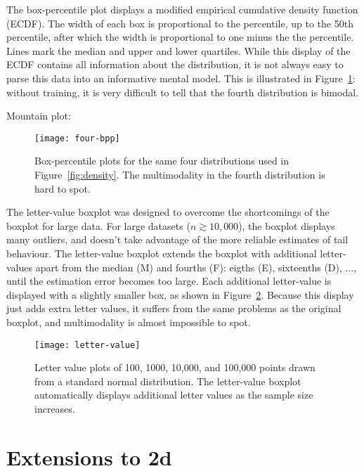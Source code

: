\documentclass[oneside]{article}
\begin{document}
The box-percentile plot \citep{esty:2003} displays a modified empirical cumulative density function (ECDF). The width of each box is proportional to the percentile, up to the 50th percentile, after which the width is proportional to one minus the the percentile. Lines mark the median and upper and lower quartiles. While this display of the ECDF contains all information about the distribution, it is not always easy to parse this data into an informative mental model. This is illustrated in Figure~\ref{fig:bpp}: without training, it is very difficult to tell that the fourth distribution is bimodal.

Mountain plot: \citep{monti:1995}

\begin{figure}[htbp]
  \centering
  \texttt{[image: four-bpp]}
  \caption{Box-percentile plots for the same four distributions used in Figure~\ref{fig:density}. The multimodality in the fourth distribution is hard to spot.}
  \label{fig:bpp}
\end{figure}

The letter-value boxplot \citep{hofmann:2006a} was designed to overcome the shortcomings of the boxplot for large data. For large datasets ($n \gtrsim 10,000$), the boxplot displays many outliers, and doesn't take advantage of the more reliable estimates of tail behaviour. The letter-value boxplot extends the boxplot with additional letter-values apart from the median (M) and fourths (F): eigths (E), sixteenths (D), ..., until the estimation error becomes too large. Each additional letter-value is displayed with a slightly smaller box, as shown in Figure~\ref{fig:letter-value}. Because this display just adds extra letter values, it suffers from the same problems as the original boxplot, and multimodality is almost impossible to spot.

\begin{figure}[htbp]
  \centering
  \texttt{[image: letter-value]}
  \caption{Letter value plots of 100, 1000, 10,000, and 100,000 points drawn from a standard normal distribution.  The letter-value boxplot automatically displays additional letter values as the sample size increases.}
  \label{fig:letter-value}
\end{figure}

\section{Extensions to 2d}
\label{sec:2d}
\end{document}
